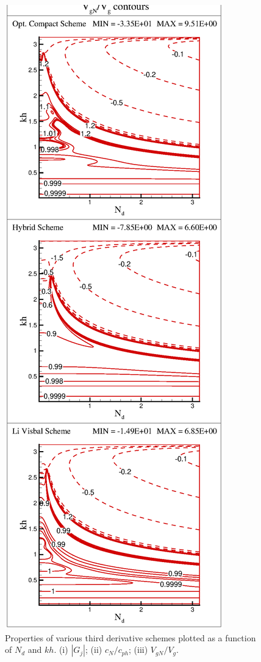 \begin{figure}[h!]
\includegraphics[scale=0.380]{Fig_7c}
\caption{Properties of various third derivative schemes plotted as a function of $N_d$ and $kh$. (i) $|G_j|$; (ii) $c_N/c_{ph}$; (iii) $V_{gN}/V_g$. }
\label{fig:props}
\end{figure}


